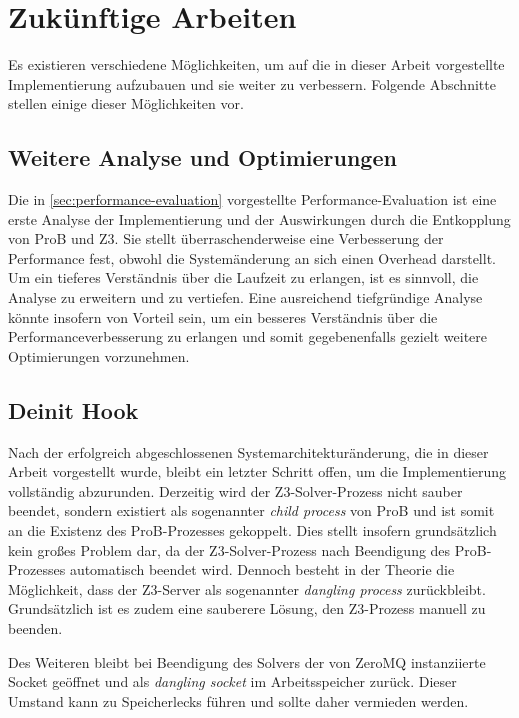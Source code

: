 

\section{Zukünftige Arbeiten}

Es existieren verschiedene Möglichkeiten, um auf die in dieser Arbeit vorgestellte Implementierung aufzubauen und sie weiter zu verbessern.
Folgende Abschnitte stellen einige dieser Möglichkeiten vor.

\subsection{Weitere Analyse und Optimierungen}

Die in \cref{sec:performance-evaluation} vorgestellte Performance-Evaluation ist eine erste Analyse der Implementierung und der Auswirkungen durch die Entkopplung von ProB und Z3.
Sie stellt überraschenderweise eine Verbesserung der Performance fest, obwohl die Systemänderung an sich einen Overhead darstellt.
Um ein tieferes Verständnis über die Laufzeit zu erlangen, ist es sinnvoll, die Analyse zu erweitern und zu vertiefen.
Eine ausreichend tiefgründige Analyse könnte insofern von Vorteil sein, um ein besseres Verständnis über die Performanceverbesserung zu erlangen und somit gegebenenfalls gezielt weitere Optimierungen vorzunehmen.

\subsection{Deinit Hook}

Nach der erfolgreich abgeschlossenen Systemarchitekturänderung, die in dieser Arbeit vorgestellt wurde,
bleibt ein letzter Schritt offen, um die Implementierung vollständig abzurunden.
Derzeitig wird der Z3-Solver-Prozess nicht sauber beendet, sondern existiert als sogenannter \textit{child process} von ProB und ist somit an die Existenz des ProB-Prozesses gekoppelt.
Dies stellt insofern grundsätzlich kein großes Problem dar, da der Z3-Solver-Prozess nach Beendigung des ProB-Prozesses automatisch beendet wird.
Dennoch besteht in der Theorie die Möglichkeit, dass der Z3-Server als sogenannter \textit{dangling process} zurückbleibt.
Grundsätzlich ist es zudem eine sauberere Lösung, den Z3-Prozess manuell zu beenden.

Des Weiteren bleibt bei Beendigung des Solvers der von ZeroMQ instanziierte Socket geöffnet und als \textit{dangling socket} im Arbeitsspeicher zurück.
Dieser Umstand kann zu Speicherlecks führen und sollte daher vermieden werden.


